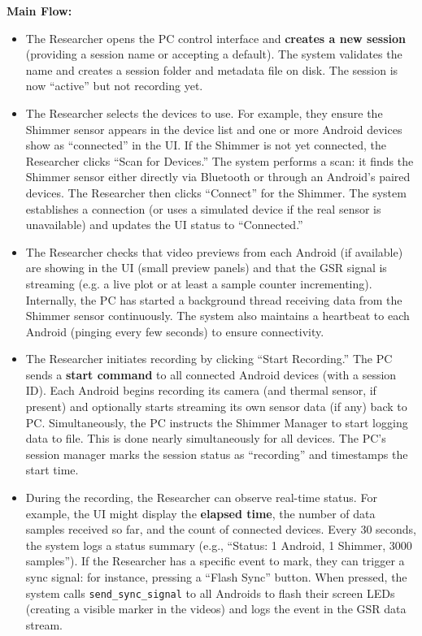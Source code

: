 \textbf{Main Flow:}
\begin{itemize}
    \item The Researcher opens the PC control interface and \textbf{creates a new session} (providing a session name or accepting a default). The system validates the name and creates a session folder and metadata file on disk. The session is now ``active'' but not recording yet.
    \item The Researcher selects the devices to use. For example, they ensure the Shimmer sensor appears in the device list and one or more Android devices show as ``connected'' in the UI. If the Shimmer is not yet connected, the Researcher clicks ``Scan for Devices.'' The system performs a scan: it finds the Shimmer sensor either directly via Bluetooth or through an Android's paired devices. The Researcher then clicks ``Connect'' for the Shimmer. The system establishes a connection (or uses a simulated device if the real sensor is unavailable) and updates the UI status to ``Connected.''
    \item The Researcher checks that video previews from each Android (if available) are showing in the UI (small preview panels) and that the GSR signal is streaming (e.g. a live plot or at least a sample counter incrementing). Internally, the PC has started a background thread receiving data from the Shimmer sensor continuously. The system also maintains a heartbeat to each Android (pinging every few seconds) to ensure connectivity.
    \item The Researcher initiates recording by clicking ``Start Recording.'' The PC sends a \textbf{start command} to all connected Android devices (with a session ID). Each Android begins recording its camera (and thermal sensor, if present) and optionally starts streaming its own sensor data (if any) back to PC. Simultaneously, the PC instructs the Shimmer Manager to start logging data to file. This is done nearly simultaneously for all devices. The PC's session manager marks the session status as ``recording'' and timestamps the start time.
    \item During the recording, the Researcher can observe real-time status. For example, the UI might display the \textbf{elapsed time}, the number of data samples received so far, and the count of connected devices. Every 30 seconds, the system logs a status summary (e.g., ``Status: 1 Android, 1 Shimmer, 3000 samples''). If the Researcher has a specific event to mark, they can trigger a sync signal: for instance, pressing a ``Flash Sync'' button. When pressed, the system calls \texttt{send\_sync\_signal} to all Androids to flash their screen LEDs (creating a visible marker in the videos) and logs the event in the GSR data stream.

\end{itemize}
